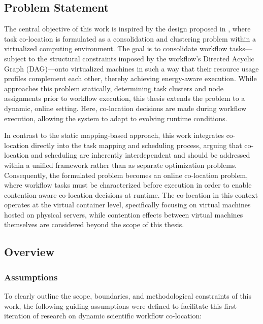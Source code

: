 \subsection{Problem Statement}
\label{sec:problem_statement}
The central objective of this work is inspired by the design proposed in \cite{5644899}, where task co-location is formulated as a consolidation and clustering problem within a virtualized computing environment. The goal is to consolidate workflow tasks—subject to the structural constraints imposed by the workflow’s Directed Acyclic Graph (DAG)—onto virtualized machines in such a way that their resource usage profiles complement each other, thereby achieving energy-aware execution. While \cite{5644899} approaches this problem statically, determining task clusters and node assignments prior to workflow execution, this thesis extends the problem to a dynamic, online setting. Here, co-location decisions are made during workflow execution, allowing the system to adapt to evolving runtime conditions.

In contrast to the static mapping-based approach, this work integrates co-location directly into the task mapping and scheduling process, arguing that co-location and scheduling are inherently interdependent and should be addressed within a unified framework rather than as separate optimization problems. Consequently, the formulated problem becomes an online co-location problem, where workflow tasks must be characterized before execution in order to enable contention-aware co-location decisions at runtime. The co-location in this context operates at the virtual container level, specifically focusing on virtual machines hosted on physical servers, while contention effects between virtual machines themselves are considered beyond the scope of this thesis.

\subsection{Overview}
\label{sec:overview}


\subsubsection{Assumptions}
\label{sec:assumptions}
To clearly outline the scope, boundaries, and methodological constraints of this work, the following guiding assumptions were defined to facilitate this first iteration of research on dynamic scientific workflow co-location:

